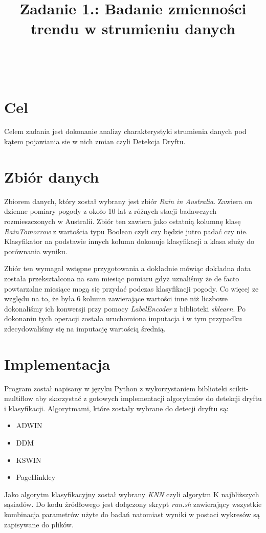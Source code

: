 \documentclass{classrep}
\author{%
    \studentinfo[239671@edu.p.lodz.pl]{Jan Karwowski}{239671}\\
    \studentinfo[239676@edu.p.lodz.pl]{Kamil Kowalewski}{239676}\\
}
\title{Zadanie 1.: Badanie zmienności trendu w strumieniu danych}
\begin{document}
    \maketitle
    \thispagestyle{fancyplain}

    \tableofcontents
    \newpage

    \section{Cel} {
        Celem zadania jest dokonanie analizy charakterystyki strumienia danych pod
        kątem pojawiania sie w nich zmian czyli Detekcja Dryftu.
    }

    \section{Zbiór danych} {
        Zbiorem danych, który został wybrany jest zbiór \emph{Rain in
        Australia}\cite{dataset_weather_aus}. Zawiera on dzienne pomiary pogody z około
        10 lat z różnych stacji badawczych rozmieszczonych w Australii. Zbiór ten
        zawiera jako ostatnią kolumnę klasę \emph{RainTomorrow} z wartościa typu
        Boolean czyli czy będzie jutro padać czy nie. Klasyfikator na podstawie innych
        kolumn dokonuje klasyfikacji a klasa służy do porównania wyniku.

        Zbiór ten wymagał wstępne przygotowania a dokładnie mówiąc dokładna data
        została przekształcona na sam miesiąc pomiaru gdyż uznaliśmy że de facto
        powtarzalne miesiące mogą się przydać podczas klasyfikacji pogody. Co więcej ze
        względu na to, że była 6 kolumn zawierające wartości inne niż liczbowe
        dokonaliśmy ich konwersji przy pomocy \emph{LabelEncoder} z biblioteki
        \emph{sklearn}. Po dokonaniu tych operacji została uruchomiona imputacja i w
        tym przypadku zdecydowaliśmy się na imputację wartością średnią.
    }

    \section{Implementacja} {
        Program został napisany w języku Python z wykorzystaniem biblioteki
        scikit-multiflow\cite{scikit_multiflow} aby skorzystać z gotowych implementacji
        algorytmów do detekcji dryftu i klasyfikacji. Algorytmami, które zostały wybrane
        do detecji dryftu są:
        \begin{itemize}
            \item ADWIN
            \item DDM
            \item KSWIN
            \item PageHinkley
        \end{itemize}
        Jako algorytm klasyfikacyjny został wybrany \textit{KNN} czyli algorytm K
        najbliższych sąsiadów. Do kodu źródłowego jest dołączony skrypt \textit{run.sh}
        zawierający wszystkie kombinacja parametrów użyte do badań natomiast wyniki w
        postaci wykresów są zapisywane do plików.
    }
\end{document}
